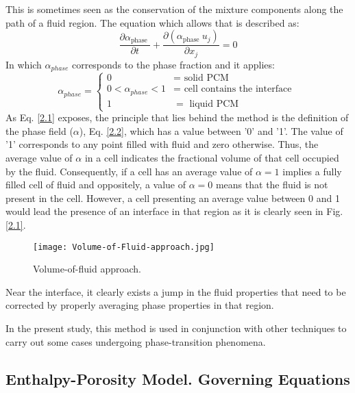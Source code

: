 \noindent This is sometimes seen as the conservation of the mixture components along the path of a fluid region. The equation which allows that is described as:
\begin{equation}
	\frac{\partial \alpha_{\text {phase }}}{\partial t}+\frac{\partial\left(\alpha_{\text {phase }} u_{j}\right)}{\partial x_{j}}=0
	\label{2.1}
\end{equation}
In which $\alpha_{phase}$ corresponds to the phase fraction and it applies:
\begin{equation}
	\alpha_{phase}= \begin{cases}
		0 & =\text { solid PCM } \\ 0<\alpha_{phase}<1 & =\text { cell contains the interface } \\ 1 & =\text { liquid } \mathrm{PCM}
	\end{cases}
	\label{2.2}
\end{equation}
\clearpage
\noindent As Eq. \ref{2.1} exposes, the principle that lies behind the method is the definition of the phase field ($\alpha$), Eq. \ref{2.2}, which has a value between '0' and '1'. The value of '1' corresponds to any point filled with fluid and zero otherwise. Thus, the average value of $\alpha$	in a cell indicates the fractional volume of that cell occupied by the fluid. Consequently, if a cell has an average value of $\alpha=1$ implies a fully filled cell of fluid and oppositely, a value of $\alpha=0$ means that the fluid is not present in the cell. However, a cell presenting an average value between 0 and 1 would lead the presence of an interface in that region as it is clearly seen in Fig. \ref{2.1}.
\begin{figure}[h!]
	\centering
	\texttt{[image: Volume-of-Fluid-approach.jpg]}	
	\label{2.1fig}
	\caption{Volume-of-fluid approach.}
\end{figure} 

\noindent Near the interface, it clearly exists a jump in the fluid properties that need to be corrected by properly averaging phase properties in that region.

\noindent In the present study, this method is used in conjunction with other techniques to carry out some cases undergoing phase-transition phenomena.

\subsection{Enthalpy-Porosity Model. Governing Equations}

